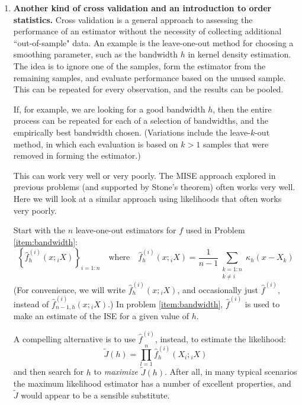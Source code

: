 \documentclass[11pt]{report}
\begin{document}
\begin{enumerate}[1.]


          \pagebreak


    \item {\bf Another kind of cross validation and an introduction to order statistics.}
          Cross validation is a general approach to assessing the performance of an estimator without the necessity of collecting additional ``out-of-sample" data.
          An example is the leave-one-out method for
          choosing a smoothing parameter, such as the bandwidth $h$ in kernel density estimation.
          The idea is to ignore one of the samples, form the estimator from the remaining samples,
          and evaluate performance based on the unused sample. This can be
          repeated for every observation, and the results can be pooled.

          If, for example, we are looking for a good bandwidth $h$, then the entire process can be repeated for each of a selection of bandwidths,
          and the empirically best bandwidth chosen.
          (Variations include the leave-$k$-out method, in which each evaluation is based on $k>1$ samples that were removed in forming the estimator.)

          This can work very well or very poorly. The MISE approach explored in previous problems (and supported by Stone's theorem) often works very well.
          Here we will look at a similar approach using likelihoods that often works very poorly.

          Start with the $n$ leave-one-out estimators for $f$ used in Problem \ref{item:bandwidth}:
          \[
              \left\{\hat{f}^{(i)}_{h}(x;{_i}X)\right\}_{i=1:n} \quad \text{where}\quad
              \hat{f}^{(i)}_{h}(x;{_i}X) = \frac{1}{n-1}\sum_{\substack{ k=1:n\\ k \neq i}} \kappa_h(x-X_k)
          \]
          (For convenience, we will write $\hat{f}^{(i)}_{h}(x;{_i}X)$, and occasionally just $\hat{f}^{(i)}$, instead of $\hat{f}^{(i)}_{n-1,h}(x;{_i}X)$.)
          In problem \ref{item:bandwidth}, $\hat{f}^{(i)}$ is used to make an estimate of the ISE for a given value of $h$.

          A compelling alternative is to use $\hat{f}^{(i)}$, instead, to estimate the likelihood:
          $$
              \tilde{J}(h)=\prod_{l=1}^n \hat{f}^{(i)}_h(X_i;{_i}X)
          $$
          and then search for $h$ to {\em maximize} $\tilde{J}(h)$. After all, in many typical scenarios the maximum likelihood estimator has a number of excellent properties, and $\tilde{J}$ would appear to be a sensible substitute.


\end{enumerate}
\end{document}
